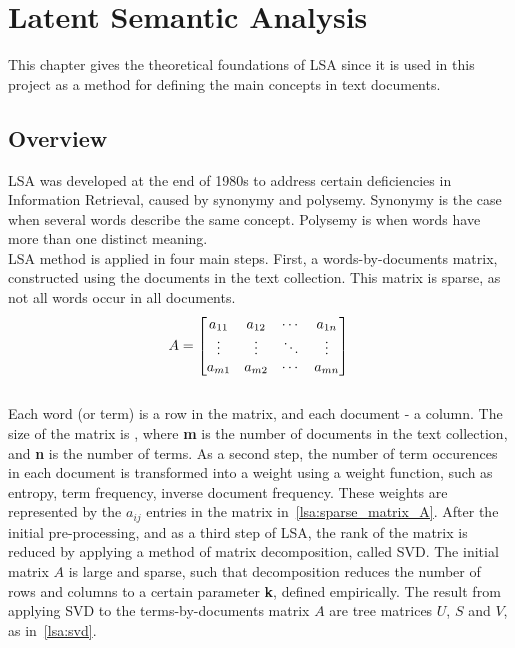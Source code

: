 \chapter{Latent Semantic Analysis}
\label{sec:lsa}

\begin{summary}
This chapter gives the theoretical foundations of \gls{LSA} since it is used in this project as a method for defining the main concepts in text documents.
\end{summary}
 

\section{Overview}


\gls{LSA} was developed at the end of 1980s to address certain deficiencies in Information Retrieval, caused by synonymy and polysemy. Synonymy is the case when several words describe the same concept. Polysemy is when words have more than one distinct meaning. \\

\gls{LSA} method is applied in four main steps. First, a words-by-documents matrix, constructed using the documents in the text collection. This matrix is sparse, as not all words occur in all documents.\\

%
%
\begin{equation}
A=
\begin{bmatrix}\label{lsa:sparse_matrix_A}
 a_{11}& a_{12}& \cdots& a_{1n} \\
 \vdots& \vdots& \ddots& \vdots \\ 
 a_{m1}& a_{m2}& \cdots& a_{mn}
\end{bmatrix}\\
\end{equation}\\

Each word (or term) is a row in the matrix, and each document - a column. The size of the matrix is , where {\bf m} is the number of documents in the text collection, and {\bf n} is the number of terms. As a second step, the number of term occurences in each document is transformed into a weight using a weight function, such as entropy, term frequency, inverse document frequency. These weights are represented by the $ a_{ij} $ entries in the matrix in~\ref{lsa:sparse_matrix_A}. After the initial pre-processing, and as a third step of \gls{LSA}, the rank of the matrix is reduced by applying a method of matrix decomposition, called \gls{SVD}. The initial matrix $A$ is large and sparse, such that decomposition reduces the number of rows and columns to a certain parameter {\bf k}, defined empirically. The result from applying \gls{SVD} to the terms-by-documents matrix $A$ are tree matrices $U$, $S$ and  $V$, as in~\ref{lsa:svd}. \\

